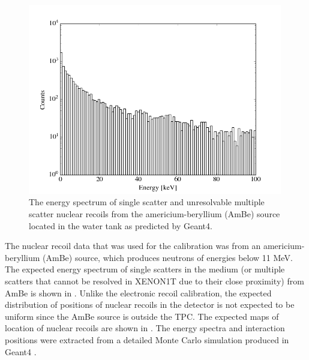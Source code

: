 \begin{figure}[t]
        \centering
	\includegraphics[width=0.99\textwidth]{xe1t_nr_energy_spec}
	\caption{The energy spectrum of single scatter and unresolvable multiple scatter nuclear recoils from the americium-beryllium (AmBe) source located in the water tank as predicted by Geant4.}
	\label{fig:xe1t_nr_energy_spec}
\end{figure}


The nuclear recoil data that was used for the calibration was from an americium-beryllium (AmBe) source, which produces neutrons of energies below 11 MeV.  The expected energy spectrum of single scatters in the medium (or multiple scatters that cannot be resolved in XENON1T due to their close proximity) from AmBe is shown in .  Unlike the electronic recoil calibration, the expected distribution of positions of nuclear recoils in the detector is not expected to be uniform since the AmBe source is outside the TPC.  The expected maps of location of nuclear recoils are shown in .  The energy spectra and interaction positions were extracted from a detailed Monte Carlo simulation produced in Geant4 \cite{agostinelli2003geant4}.



